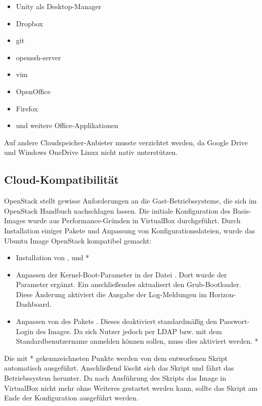 \begin{itemize}
\item Unity als Desktop-Manager
\item Dropbox
\item git
\item openssh-server
\item vim
\item OpenOffice
\item Firefox
\item und weitere Office-Applikationen
\end{itemize}

Auf andere Cloudspeicher-Anbieter musste verzichtet werden, da Google Drive und Windows OneDrive Linux nicht nativ unterstützen.

\subsection{Cloud-Kompatibilität}

OpenStack stellt gewisse Anforderungen an die Gast-Betriebssysteme, die sich im OpenStack Handbuch \cite{osImageRequirement} nachschlagen lassen. 
Die initiale Konfiguration des Basis-Images wurde aus Performance-Gründen in VirtualBox durchgeführt.
Durch Installation einiger Pakete und Anpassung von Konfigurationsdateien, wurde das Ubuntu Image OpenStack kompatibel gemacht:

\begin{itemize}
\item Installation von ,  und  *
\item Anpassen der Kernel-Boot-Parameter in der Datei . Dort wurde der Parameter  ergänzt. Ein anschließendes  aktualisert den Grub-Bootloader. Diese Änderung aktiviert die Ausgabe der Log-Meldungen im Horizon-Dashboard.
\item Anpassen von  des Pakets . Dieses deaktiviert standardmäßig den Passwort-Login des Images. Da sich Nutzer jedoch per LDAP bzw. mit dem Standardbenutzername anmelden können sollen, muss dies aktiviert werden. *
\end{itemize}

Die mit * gekennzeichneten Punkte werden von dem entworfenen Skript  automatisch ausgeführt. 
Anschließend löscht sich das Skript und fährt das Betriebssystem herunter.
Da nach Ausführung des  Skripts das Image in VirtualBox nicht mehr ohne Weiteres gestartet werden kann, sollte das Skript am Ende der Konfiguration ausgeführt werden.


